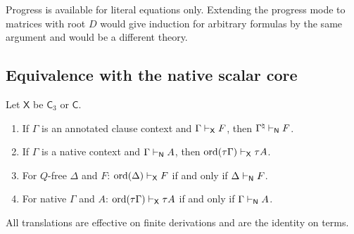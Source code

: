 Progress is available for literal equations only. Extending the progress
mode to matrices with root $D$ would give induction for arbitrary formulas
by the same argument and would be a different theory.

\subsection{Equivalence with the native scalar core}

\begin{theorem}
\label{claus:thm:five}
Let $\mathsf{X}$ be $\mathsf{C}_3$ or $\mathsf{C}$.
\begin{enumerate}[label=(\roman*)]
\item If $\Gamma$ is an annotated clause context and
$\Gamma\vdash_{\mathsf{X}}F$, then $\Gamma^{\natural}\vdash_{\mathsf{N}}F$.
\item If $\Gamma$ is a native context and $\Gamma\vdash_{\mathsf{N}}A$, then
$\operatorname{ord}(\tau\Gamma)\vdash_{\mathsf{X}}\tau A$.
\item For $Q$-free $\Delta$ and $F$:
$\operatorname{ord}(\Delta)\vdash_{\mathsf{X}}F$ if and only if
$\Delta\vdash_{\mathsf{N}}F$.
\item For native $\Gamma$ and $A$:
$\operatorname{ord}(\tau\Gamma)\vdash_{\mathsf{X}}\tau A$ if and only if
$\Gamma\vdash_{\mathsf{N}}A$.
\end{enumerate}
All translations are effective on finite derivations and are the identity
on terms.
\end{theorem}
